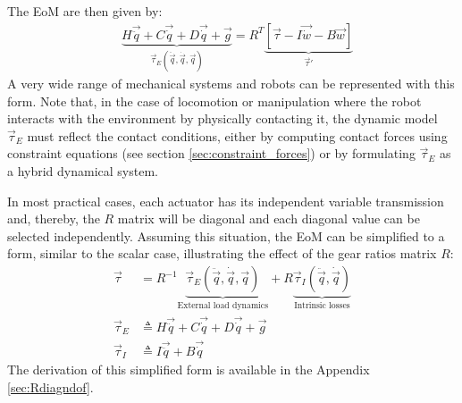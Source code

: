 The EoM are then given by:
%
\begin{align}
	&\underbrace{ H \vec{ \ddot{q} } + C\vec{ \dot{q} } + D \vec{ \dot{q} } + \vec{ g } }_{ \vec{\tau}_{E}(\ddot{\vec{q}},\dot{\vec{q}},\vec{q})}
		= R^T \underbrace{  \left[ 
		\vec{ \tau } - I \vec{ \dot{w} } - B \vec{ w }       
		\right]}_{ \vec{\tau}' } 
 \label{eq:eom_ndof}
\end{align}
%
A very wide range of mechanical systems and robots can be represented with this form. Note that, in the case of locomotion or manipulation where the robot interacts with the environment by physically contacting it, the dynamic model $\vec{\tau}_{E}$ must reflect the contact conditions, either by computing contact forces using constraint equations (see section \ref{sec:constraint_forces}) or by formulating $\vec{\tau}_{E}$ as a hybrid dynamical system.

In most practical cases, each actuator has its independent variable transmission and, thereby, the $R$ matrix will be diagonal and each diagonal value can be selected independently. Assuming this situation, the EoM can be simplified to a form, similar to the scalar case, illustrating the effect of the gear ratios matrix $R$: 
%
\begin{align}
	\vec{\tau} &= R^{-1} 
	\underbrace{ 
	\vec{\tau}_{E}(\ddot{\vec{q}},\dot{\vec{q}},\vec{q}) 
	}_{\text{External load dynamics}}
	+ R 
	\underbrace{ 
	\vec{\tau}_{I}(\ddot{\vec{q}},\dot{\vec{q}})
		}_{\text{Intrinsic losses}}
	\\ %
	\vec{\tau}_{E} &\triangleq H \vec{ \ddot{q} } + C\vec{ \dot{q} } + D \vec{ \dot{q} } + \vec{ g } \\
	\vec{\tau}_{I} &\triangleq I \vec{ \ddot{q} } + B \vec{ \dot{q} } 
 \label{eq:eom_ndof2}
\end{align}
%
The derivation of this simplified form is available in the Appendix \ref{sec:Rdiagndof}.

